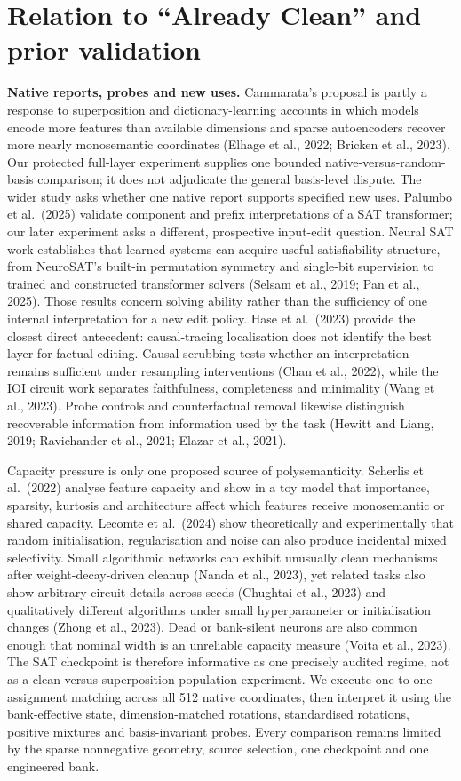 \documentclass[
  british,
  11pt,
  a4paper,
]{article}
\begin{document}
\section{Relation to ``Already Clean'' and prior
validation}\label{relation-to-already-clean-and-prior-validation}

\textbf{Native reports, probes and new uses.} Cammarata's proposal is
partly a response to superposition and dictionary-learning accounts in
which models encode more features than available dimensions and sparse
autoencoders recover more nearly monosemantic coordinates (Elhage et
al., 2022; Bricken et al., 2023). Our protected full-layer experiment
supplies one bounded native-versus-random-basis comparison; it does not
adjudicate the general basis-level dispute. The wider study asks whether
one native report supports specified new uses. Palumbo et al.~(2025)
validate component and prefix interpretations of a SAT transformer; our
later experiment asks a different, prospective input-edit question.
Neural SAT work establishes that learned systems can acquire useful
satisfiability structure, from NeuroSAT's built-in permutation symmetry
and single-bit supervision to trained and constructed transformer
solvers (Selsam et al., 2019; Pan et al., 2025). Those results concern
solving ability rather than the sufficiency of one internal
interpretation for a new edit policy. Hase et al.~(2023) provide the
closest direct antecedent: causal-tracing localisation does not identify
the best layer for factual editing. Causal scrubbing tests whether an
interpretation remains sufficient under resampling interventions (Chan
et al., 2022), while the IOI circuit work separates faithfulness,
completeness and minimality (Wang et al., 2023). Probe controls and
counterfactual removal likewise distinguish recoverable information from
information used by the task (Hewitt and Liang, 2019; Ravichander et
al., 2021; Elazar et al., 2021).

Capacity pressure is only one proposed source of polysemanticity.
Scherlis et al.~(2022) analyse feature capacity and show in a toy model
that importance, sparsity, kurtosis and architecture affect which
features receive monosemantic or shared capacity. Lecomte et al.~(2024)
show theoretically and experimentally that random initialisation,
regularisation and noise can also produce incidental mixed selectivity.
Small algorithmic networks can exhibit unusually clean mechanisms after
weight-decay-driven cleanup (Nanda et al., 2023), yet related tasks also
show arbitrary circuit details across seeds (Chughtai et al., 2023) and
qualitatively different algorithms under small hyperparameter or
initialisation changes (Zhong et al., 2023). Dead or bank-silent neurons
are also common enough that nominal width is an unreliable capacity
measure (Voita et al., 2023). The SAT checkpoint is therefore
informative as one precisely audited regime, not as a
clean-versus-superposition population experiment. We execute one-to-one
assignment matching across all 512 native coordinates, then interpret it
using the bank-effective state, dimension-matched rotations,
standardised rotations, positive mixtures and basis-invariant probes.
Every comparison remains limited by the sparse nonnegative geometry,
source selection, one checkpoint and one engineered bank.
\end{document}
